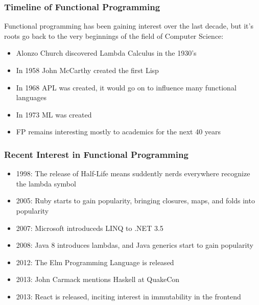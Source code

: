 \documentclass{beamer}
\begin{document}
\begin{frame}
  \frametitle{Timeline of Functional Programming}
  Functional programming has been gaining interest over the last
  decade, but it's roots go back to the very beginnings of the field
  of Computer Science:
  \begin{itemize}
    \item Alonzo Church discovered Lambda Calculus in the 1930's
    \item In 1958 John McCarthy created the first Lisp
    \item In 1968 APL was created, it would go on to influence many
      functional languages
    \item In 1973 ML was created
    \item FP remains interesting mostly to academics for the next 40 years
  \end{itemize}
\end{frame}

\begin{frame}
  \frametitle{Recent Interest in Functional Programming}
  \begin{itemize}
  \item 1998: The release of Half-Life means suddently nerds everywhere recognize the lambda symbol
  \item 2005: Ruby starts to gain popularity, bringing closures, maps, and folds into popularity
  \item 2007: Microsoft introduceds LINQ to .NET 3.5
  \item 2008: Java 8 introduces lambdas, and Java generics start to gain popularity
  \item 2012: The Elm Programming Language is released
  \item 2013: John Carmack mentions Haskell at QuakeCon
  \item 2013: React is released, inciting interest in immutability in the frontend
  \end{itemize}
\end{frame}
\end{document}
